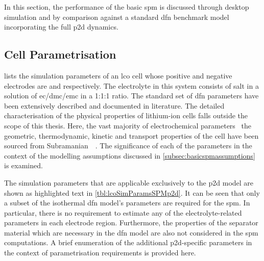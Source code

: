 
In this  section, the performance  of the  basic \gls{spm} is  discussed through
desktop  simulation and  by comparison  against a  standard \gls{dfn}  benchmark
model incorporating the full \gls{p2d} dynamics.


\subsection{Cell Parametrisation}\label{subsec:spmp2dparametrisation}


 lists  the simulation  parameters of  an \gls{lco}
cell  whose positive  and negative  electrodes are   and  
respectively.  The  electrolyte in  this  system  consists of    salt
in  a   solution  of   \gls{ec}/\gls{dmc}/\gls{emc}  in   a  1:1:1   ratio.  The
standard  set  of  \gls{dfn}  parameters have  been  extensively  described  and
documented  in  literature.  The   detailed  characterisation  of  the  physical
properties  of  lithium-ion  cells  falls  outside the  scope  of  this  thesis.
Here,  the vast  majority of  electrochemical parameters  \viz~the  geometric,
thermodynamic, kinetic  and transport properties  of the cell have  been sourced
from  Subramanian~\etal{}~\cite{Subramanian2009}. The  significance  of each  of
the  parameters  in  the  context  of the  modelling  assumptions  discussed  in
\cref{subsec:basicspmassumptions} is examined.

The simulation parameters that are applicable exclusively to the \gls{p2d} model
are shown as  highlighted text in \cref{tbl:lcoSimParamsSPMp2d}. It  can be seen
that only a  subset of the isothermal \gls{dfn} model's  parameters are required
for the \gls{spm}. In particular, there is no requirement to estimate any of the
electrolyte-related  parameters  in  each  electrode  region.  Furthermore,  the
properties of the separator material which  are necessary in the \gls{dfn} model
are also  not considered in the  \gls{spm} computations. A brief  enumeration of
the additional  \gls{p2d}-specific parameters in the  context of parametrisation
requirements is provided here.

